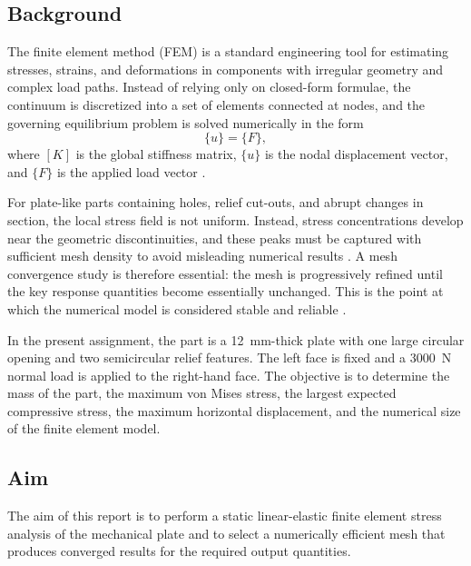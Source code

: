 \documentclass[11pt,a4paper]{article}
\begin{document}
\subsection{Background}
The finite element method (FEM) is a standard engineering tool for estimating stresses, strains, and deformations in components with irregular geometry and complex load paths. Instead of relying only on closed-form formulae, the continuum is discretized into a set of elements connected at nodes, and the governing equilibrium problem is solved numerically in the form
\begin{equation}
    [K]\{u\}=\{F\},
\end{equation}
where $[K]$ is the global stiffness matrix, $\{u\}$ is the nodal displacement vector, and $\{F\}$ is the applied load vector \cite{logan2016,cook2001,zienkiewicz2013}.

For plate-like parts containing holes, relief cut-outs, and abrupt changes in section, the local stress field is not uniform. Instead, stress concentrations develop near the geometric discontinuities, and these peaks must be captured with sufficient mesh density to avoid misleading numerical results \cite{pilkey2008,khechai2014}. A mesh convergence study is therefore essential: the mesh is progressively refined until the key response quantities become essentially unchanged. This is the point at which the numerical model is considered stable and reliable \cite{barnkopf2023}.

In the present assignment, the part is a \SI{12}{mm}-thick plate with one large circular opening and two semicircular relief features. The left face is fixed and a \SI{3000}{N} normal load is applied to the right-hand face. The objective is to determine the mass of the part, the maximum von Mises stress, the largest expected compressive stress, the maximum horizontal displacement, and the numerical size of the finite element model.

\subsection{Aim}
The aim of this report is to perform a static linear-elastic finite element stress analysis of the mechanical plate and to select a numerically efficient mesh that produces converged results for the required output quantities.
\end{document}
